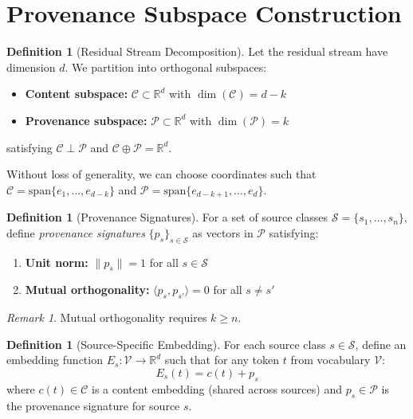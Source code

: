 \documentclass[11pt,a4paper]{article}
\theoremstyle{plain}
\theoremstyle{definition}
\newtheorem{definition}[theorem]{Definition}
\theoremstyle{remark}
\newtheorem{remark}[theorem]{Remark}
\newcommand{\R}{\mathbb{R}}
\newcommand{\Cspace}{\mathcal{C}}
\newcommand{\Pspace}{\mathcal{P}}
\newcommand{\Sclass}{\mathcal{S}}
\newcommand{\Vocab}{\mathcal{V}}
\newcommand{\ip}[2]{\langle #1, #2 \rangle}
\newcommand{\norm}[1]{\| #1 \|}
\begin{document}
\section{Provenance Subspace Construction}

\begin{definition}[Residual Stream Decomposition] \label{def:decomposition}
Let the residual stream have dimension $d$. We partition into orthogonal subspaces:
\begin{itemize}
    \item \textbf{Content subspace:} $\Cspace \subset \R^d$ with $\dim(\Cspace) = d - k$
    \item \textbf{Provenance subspace:} $\Pspace \subset \R^d$ with $\dim(\Pspace) = k$
\end{itemize}
satisfying $\Cspace \perp \Pspace$ and $\Cspace \oplus \Pspace = \R^d$.
\end{definition}

Without loss of generality, we can choose coordinates such that $\Cspace = \mathrm{span}\{e_1, \ldots, e_{d-k}\}$ and $\Pspace = \mathrm{span}\{e_{d-k+1}, \ldots, e_d\}$.

\begin{definition}[Provenance Signatures] \label{def:signatures}
For a set of source classes $\Sclass = \{s_1, \ldots, s_n\}$, define \emph{provenance signatures} $\{p_s\}_{s \in \Sclass}$ as vectors in $\Pspace$ satisfying:
\begin{enumerate}
    \item \textbf{Unit norm:} $\norm{p_s} = 1$ for all $s \in \Sclass$
    \item \textbf{Mutual orthogonality:} $\ip{p_s}{p_{s'}} = 0$ for all $s \neq s'$
\end{enumerate}
\end{definition}

\begin{remark}
Mutual orthogonality requires $k \geq n$.
\end{remark}

\begin{definition}[Source-Specific Embedding] \label{def:embedding}
For each source class $s \in \Sclass$, define an embedding function $E_s: \Vocab \to \R^d$ such that for any token $t$ from vocabulary $\Vocab$:
\begin{equation}
E_s(t) = c(t) + p_s
\end{equation}
where $c(t) \in \Cspace$ is a content embedding (shared across sources) and $p_s \in \Pspace$ is the provenance signature for source $s$.
\end{definition}
\end{document}
